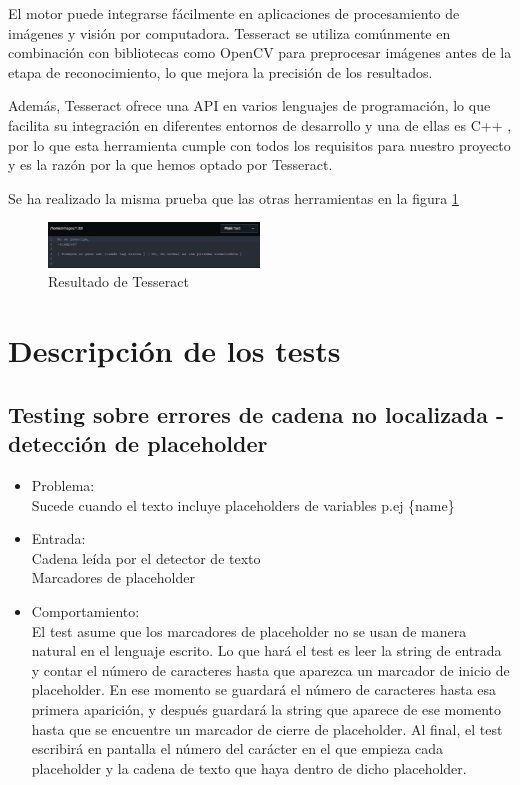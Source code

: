 \begin{enumerate}
	El motor puede integrarse fácilmente en aplicaciones de procesamiento de imágenes y visión por computadora. Tesseract se utiliza comúnmente en combinación con bibliotecas como OpenCV para preprocesar imágenes antes de la etapa de reconocimiento, lo que mejora la precisión de los resultados.
	
	Además, Tesseract ofrece una API en varios lenguajes de programación, lo que facilita su integración en diferentes entornos de desarrollo y una de ellas es C++ , por lo que esta herramienta cumple con todos los requisitos para nuestro proyecto y es la razón por la que hemos optado por Tesseract.
	
	Se ha realizado la misma prueba que las otras herramientas en la figura \ref{fig:Tesseract_Test}
		\begin{figure}[h]
		\centering
		\includegraphics[width = 0.5\textwidth]{Imagenes/OCR/Tesseract_Test.png}
		\caption{Resultado de Tesseract}
		\label{fig:Tesseract_Test}
	\end{figure}
\end{enumerate}
\section{Descripción de los tests}
\subsection{Testing sobre errores de cadena no localizada - detección de placeholder}
\begin{itemize}
	\item Problema: \\
	Sucede cuando el texto incluye placeholders de variables p.ej \{name\}  \\
	\item Entrada: \\
	Cadena leída por el detector de texto \\
	Marcadores de placeholder \\
	\item Comportamiento: \\
	El test asume que los marcadores de placeholder no se usan de manera natural en el lenguaje escrito.
	Lo que hará el test es leer la string de entrada y contar el número de caracteres hasta que aparezca un marcador de inicio de placeholder. En ese momento se guardará el número de caracteres hasta esa primera aparición, y después guardará la string que aparece de ese momento hasta que se encuentre un marcador de cierre de placeholder. 
	Al final, el test escribirá en pantalla el número del carácter en el que empieza cada placeholder y la cadena de texto que haya dentro de dicho placeholder.
\end{itemize}

